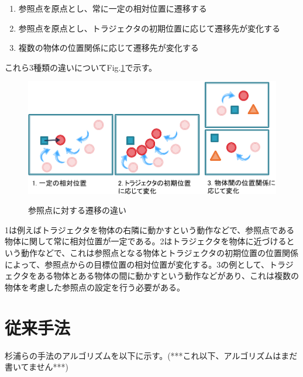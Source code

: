 	\begin{enumerate}
		\item 参照点を原点とし、常に一定の相対位置に遷移する
		\item 参照点を原点とし、トラジェクタの初期位置に応じて遷移先が変化する
		\item 複数の物体の位置関係に応じて遷移先が変化する
	\end{enumerate}
これら3種類の違いについてFig.\ref{figure:difference_displacement}で示す。
	\begin{figure}[t]
		\begin{center}
			\includegraphics[width=14cm]{figure2.png} \\ %
			\caption{参照点に対する遷移の違い}
			\label{figure:difference_displacement}
		\end{center}
	\end{figure}
1は例えばトラジェクタを物体の右隣に動かすという動作などで、参照点である物体に関して常に相対位置が一定である。2はトラジェクタを物体に近づけるという動作などで、これは参照点となる物体とトラジェクタの初期位置の位置関係によって、参照点からの目標位置の相対位置が変化する。3の例として、トラジェクタをある物体とある物体の間に動かすという動作などがあり、これは複数の物体を考慮した参照点の設定を行う必要がある。

\section{従来手法}

杉浦ら\cite{sugiura}の手法のアルゴリズムを以下に示す。(***これ以下、アルゴリズムはまだ書いてません***)

